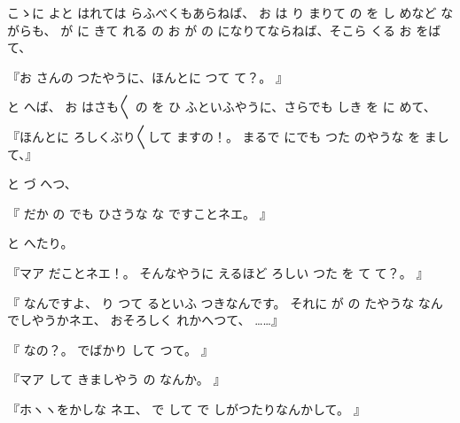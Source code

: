 
こゝに
よと
はれては
らふべくもあらねば、
お
は
り
まりて
の
を
し
めなど
ながらも、
が
に
きて
れる
の
お
が
の
になりてならねば、そこら
くる
お
をば
て、

『お
さんの
つたやうに、ほんとに
つて
て？。
』

と
へば、
お
はさも〳〵
の
を
ひ
ふといふやうに、さらでも
しき
を
に
めて、

『ほんとに
ろしくぶり〳〵して
ますの！。
まるで
にでも
つた
のやうな
を
まして、』

と
づ
へつ、

『
だか
の
でも
ひさうな
な
ですことネエ。
』

と
へたり。

『マア
だことネエ！。
そんなやうに
えるほど
ろしい
つた
を
て
て？。
』

『
なんですよ、
り
つて
るといふ
つきなんです。
それに
が
の
たやうな
なんでしやうかネエ、
おそろしく
れかへつて、
……』

『
なの？。
でばかり
して
つて。
』

『マア
して
きましやう
の
なんか。
』

『ホヽヽをかしな
ネエ、
で
して
で
しがつたりなんかして。
』

